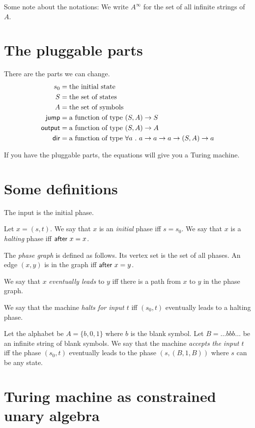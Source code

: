 Some note about the notations:
We write \(A^\infty\) for the set of all infinite strings of \(A\).

\section{The pluggable parts}

There are the parts we can change.
\begin{align}
    s_0 &= \text{the initial state}
    \\
    S &= \text{the set of states}
    \\
    A &= \text{the set of symbols}
    \\
    \textsf{jump} &= \text{a function of type \((S,A) \to S\)}
    \\
    \textsf{output} &= \text{a function of type \((S,A) \to A\)}
    \\
    \textsf{dir} &= \text{a function of type \(\forall a ~.~ a \to a \to a \to (S,A) \to a\)}
\end{align}

If you have the pluggable parts,
the equations will give you a Turing machine.

\section{Some definitions}

The input is the initial phase.

Let \(x = (s,t)\).
We say that \(x\) is an \emph{initial} phase iff \(s = s_0\).
We say that \(x\) is a \emph{halting} phase iff \(\textsf{after}~x = x\).

The \emph{phase graph} is defined as follows.
Its vertex set is the set of all phases.
An edge \((x,y)\) is in the graph iff \(\textsf{after}~x = y\).

We say that \(x\) \emph{eventually leads} to \(y\) iff
there is a path from \(x\) to \(y\) in the phase graph.

We say that the machine \emph{halts for input \(t\)} iff
\((s_0,t)\) eventually leads to a halting phase.

Let the alphabet be \(A = \{b,0,1\}\) where \(b\) is the blank symbol.
Let \(B = \ldots bbb \ldots\) be an infinite string of blank symbols.
We say that the machine \emph{accepts the input \(t\)} iff
the phase \((s_0,t)\) eventually leads to the phase \((s, (B,1,B))\)
where \(s\) can be any state.

\section{Turing machine as constrained unary algebra}

